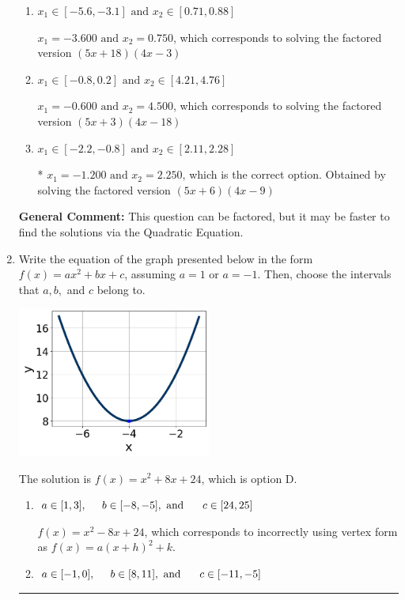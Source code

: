 \documentclass{extbook}[14pt]
\newcommand{\litem}[1]{\item #1

\rule{\textwidth}{0.4pt}}
\begin{document}
\begin{enumerate}
{\begin{enumerate}[label=\Alph*.]
$x_1 = -6.000 \text{ and } x_2 = 0.450$, which corresponds to solving the factored version $(x + 6)(20x -9)$
\item \( x_1 \in [-5.6, -3.1] \text{ and } x_2 \in [0.71, 0.88] \)

$x_1 = -3.600 \text{ and } x_2 = 0.750$, which corresponds to solving the factored version $(5x + 18)(4x -3)$
\item \( x_1 \in [-0.8, 0.2] \text{ and } x_2 \in [4.21, 4.76] \)

$x_1 = -0.600 \text{ and } x_2 = 4.500$, which corresponds to solving the factored version $(5x + 3)(4x -18)$
\item \( x_1 \in [-2.2, -0.8] \text{ and } x_2 \in [2.11, 2.28] \)

* $x_1 = -1.200 \text{ and } x_2 = 2.250$, which is the correct option. Obtained by solving the factored version $(5x + 6)(4x -9)$
\end{enumerate}

\textbf{General Comment:} This question can be factored, but it may be faster to find the solutions via the Quadratic Equation.
}
\litem{
Write the equation of the graph presented below in the form $f(x)=ax^2+bx+c$, assuming  $a=1$ or $a=-1$. Then, choose the intervals that $a, b,$ and $c$ belong to.

\begin{center}
    \includegraphics[width=0.5\textwidth]{../Figures/quadraticGraphToEquationCopyC.png}
\end{center}


The solution is \( f(x) = x^{2} +8 x + 24 \), which is option D.\begin{enumerate}[label=\Alph*.]
\item \( a \in [1, 3], \hspace*{5mm} b \in [-8, -5], \text{ and } \hspace*{5mm} c \in [24, 25] \)

$f(x)=x^{2} -8 x + 24$, which corresponds to incorrectly using vertex form as $f(x) = a(x+h)^2+k$.
\item \( a \in [-1, 0], \hspace*{5mm} b \in [8, 11], \text{ and } \hspace*{5mm} c \in [-11, -5] \)


\end{enumerate}}
\end{enumerate}
\end{document}
